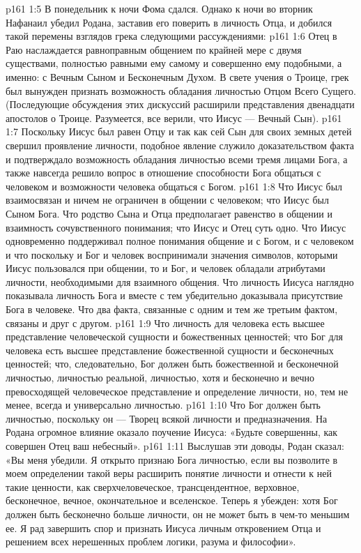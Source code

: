 \vs p161 1:5 В понедельник к ночи Фома сдался. Однако к ночи во вторник Нафанаил убедил Родана, заставив его поверить в личность Отца, и добился такой перемены взглядов грека следующими рассуждениями:
\vs p161 1:6 \bibnobreakspace Отец в Раю наслаждается равноправным общением по крайней мере с двумя существами, полностью равными ему самому и совершенно ему подобными, а именно: с Вечным Сыном и Бесконечным Духом. В свете учения о Троице, грек был вынужден признать возможность обладания личностью Отцом Всего Сущего. (Последующие обсуждения этих дискуссий расширили представления двенадцати апостолов о Троице. Разумеется, все верили, что Иисус --- Вечный Сын).
\vs p161 1:7 \pc {}\bibnobreakspace Поскольку Иисус был равен Отцу и так как сей Сын для своих земных детей свершил проявление личности, подобное явление служило доказательством факта и подтверждало возможность обладания личностью всеми тремя лицами Бога, а также навсегда решило вопрос в отношение способности Бога общаться с человеком и возможности человека общаться с Богом.
\vs p161 1:8 \pc {}\bibnobreakspace Что Иисус был взаимосвязан и ничем не ограничен в общении с человеком; что Иисус был Сыном Бога. Что родство Сына и Отца предполагает равенство в общении и взаимность сочувственного понимания; что Иисус и Отец суть одно. Что Иисус одновременно поддерживал полное понимания общение и с Богом, и с человеком и что поскольку и Бог и человек воспринимали значения символов, которыми Иисус пользовался при общении, то и Бог, и человек обладали атрибутами личности, необходимыми для взаимного общения. Что личность Иисуса наглядно показывала личность Бога и вместе с тем убедительно доказывала присутствие Бога в человеке. Что два факта, связанные с одним и тем же третьим фактом, связаны и друг с другом.
\vs p161 1:9 \pc {}\bibnobreakspace Что личность для человека есть высшее представление человеческой сущности и божественных ценностей; что Бог для человека есть высшее представление божественной сущности и бесконечных ценностей; что, следовательно, Бог должен быть божественной и бесконечной личностью, личностью реальной, личностью, хотя и бесконечно и вечно превосходящей человеческое представление и определение личности, но, тем не менее, всегда и универсально личностью.
\vs p161 1:10 \pc {}\bibnobreakspace Что Бог должен быть личностью, поскольку он --- Творец всякой личности и предназначения. На Родана огромное влияние оказало поучение Иисуса: «Будьте совершенны, как совершен Отец ваш небесный».
\vs p161 1:11 \pc Выслушав эти доводы, Родан сказал: «Вы меня убедили. Я открыто признаю Бога личностью, если вы позволите в моем определении такой веры расширить понятие личности и отнести к ней такие ценности, как сверхчеловеческое, трансцендентное, верховное, бесконечное, вечное, окончательное и вселенское. Теперь я убежден: хотя Бог должен быть бесконечно больше личности, он не может быть в чем\hyp{}то меньшим ее. Я рад завершить спор и признать Иисуса личным откровением Отца и решением всех нерешенных проблем логики, разума и философии».
